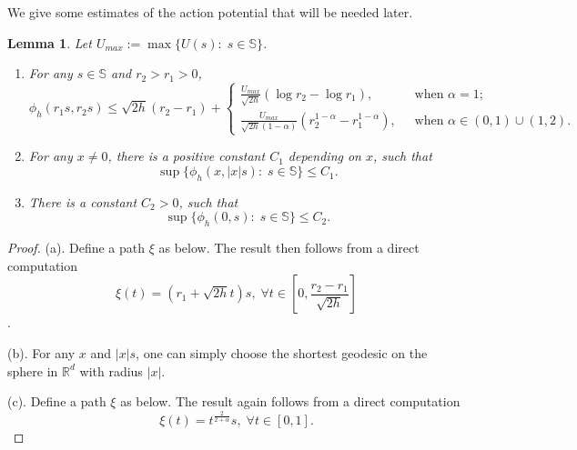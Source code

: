 \documentclass[11pt]{amsart}
\newcommand{\rr}{\mathbb R}
\newcommand{\bs}{\mathbb S}
\newcommand{\al}{\alpha}
\theoremstyle{plain}
\newtheorem{lem}{Lemma}[section]
\theoremstyle{definition}
\theoremstyle{remark}
\begin{document}

We give some estimates of the action potential that will be needed later. 

\begin{lem}
\label{lem;phh-le} Let $U_{max}:= \max\{ U(s): \; s \in \bs\}$.
\begin{enumerate}
\item[(a).] For any $s \in \bs$ and $r_2 >r_1 >0$, 
$$ \phi_h(r_1 s, r_2 s) \le \sqrt{2h}(r_2 -r_1)+ \begin{cases}
\frac{U_{max}}{\sqrt{2h}}(\log r_2 - \log r_1) , \; & \text{ when } \al =1; \\ 
\frac{U_{max}}{\sqrt{2h}(1-\al)} (r_2^{1-\al} - r_1^{1-\al}), \; & \text{ when } \al \in (0, 1) \cup (1, 2).
\end{cases}
$$ 
\item[(b).] For any $x \ne 0$, there is a positive constant $C_1$ depending on $x$, such that 
$$ \sup \{ \phi_h(x, |x|s): \; s \in \bs \} \le C_1. $$
\item[(c).] There is a constant $C_2>0$, such that 
$$ \sup \{\phi_h(0, s): \; s \in \bs \} \le C_2.$$
\end{enumerate}

\end{lem}
\begin{proof}
(a). Define a path $\xi$ as below. The result then follows from a direct computation 
$$  \xi(t) = (r_1+ \sqrt{2h}t)s, \; \forall t \in \left[0, \frac{r_2 -r_1}{\sqrt{2h}} \right]$$. 

(b). For any $x$ and $|x|s$, one can simply choose the shortest geodesic on the sphere in $\rr^d$ with radius $|x|$. 

(c). Define a path $\xi$ as below. The result again follows from a direct computation
$$ \xi(t) = t^\frac{2}{2 +\al} s, \; \forall t \in [0, 1]. $$


\end{proof}
\end{document}
